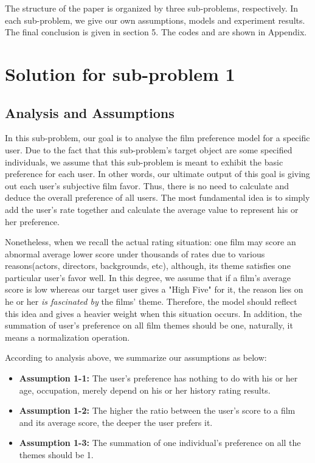 The structure of the paper is organized by three sub-problems, respectively. In each sub-problem, we give our own assumptions, models and experiment results. The final conclusion is given in section 5. The codes and are shown in Appendix. 

\section{Solution for sub-problem 1}
\subsection{Analysis and Assumptions}
In this sub-problem, our goal is to analyse the film preference model for a specific user. Due to the fact that this sub-problem's target object are some specified individuals, we assume that this sub-problem is meant to exhibit the basic preference for each user. In other words, our ultimate output of this goal is giving out each user's subjective film favor. Thus, there is no need to calculate and deduce the overall preference of all users. The most fundamental idea is to simply add the user's rate together and calculate the average value to represent his or her preference. 

Nonetheless, when we recall the actual rating situation: one film may score an abnormal average lower score under thousands of rates due to various reasons(actors, directors, backgrounds, etc), although, its theme satisfies one particular user's favor well. In this degree, we assume that if a film's average score is low whereas our target user gives a "High Five" for it, the reason lies on he or her \textit{is fascinated by} the films' theme. Therefore, the model should reflect this idea and gives a heavier weight when this situation occurs. In addition, the summation of user's preference on all film themes should be one, naturally, it means a normalization operation. 

According to analysis above, we summarize our assumptions as below:
\begin{itemize}
\item \textbf{Assumption 1-1:} The user's preference has nothing to do with his or her age, occupation, merely depend on his or her history rating results.

\item \textbf{Assumption 1-2:} The higher the ratio between the user's score to a film and its average score, the deeper the user prefers it.

\item\textbf{Assumption 1-3:} The summation of one individual's preference on all the themes should be 1.
\end{itemize} 

